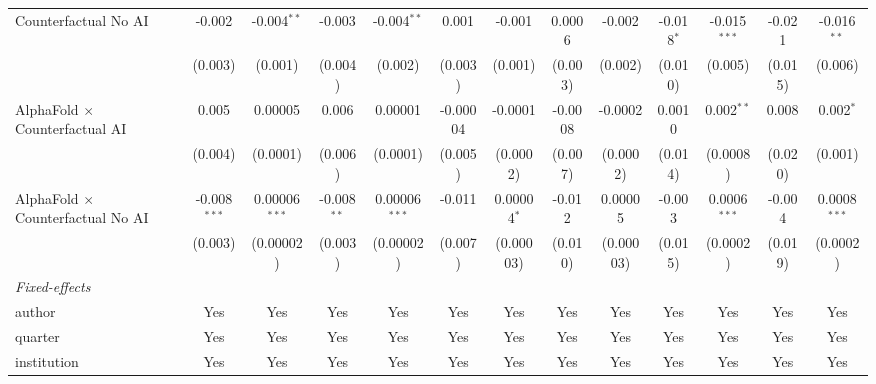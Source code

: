 \begin{tabular}{lcccccccccccc}
   Counterfactual No AI                     & -0.002         & -0.004$^{**}$   & -0.003         & -0.004$^{**}$   & 0.001         & -0.001        & 0.0006       & -0.002       & -0.018$^{*}$   & -0.015$^{***}$ & -0.021        & -0.016$^{**}$\\   
                                            & (0.003)        & (0.001)         & (0.004)        & (0.002)         & (0.003)       & (0.001)       & (0.003)      & (0.002)      & (0.010)        & (0.005)        & (0.015)       & (0.006)\\   
   AlphaFold $\times$ Counterfactual AI     & 0.005          & 0.00005         & 0.006          & 0.00001         & -0.00004      & -0.0001       & -0.0008      & -0.0002      & 0.0010         & 0.002$^{**}$   & 0.008         & 0.002$^{*}$\\   
                                            & (0.004)        & (0.0001)        & (0.006)        & (0.0001)        & (0.005)       & (0.0002)      & (0.007)      & (0.0002)     & (0.014)        & (0.0008)       & (0.020)       & (0.001)\\   
   AlphaFold $\times$ Counterfactual No AI  & -0.008$^{***}$ & 0.00006$^{***}$ & -0.008$^{**}$  & 0.00006$^{***}$ & -0.011        & 0.00004$^{*}$ & -0.012       & 0.00005      & -0.003         & 0.0006$^{***}$ & -0.004        & 0.0008$^{***}$\\   
                                            & (0.003)        & (0.00002)       & (0.003)        & (0.00002)       & (0.007)       & (0.00003)     & (0.010)      & (0.00003)    & (0.015)        & (0.0002)       & (0.019)       & (0.0002)\\   
   \midrule
   \emph{Fixed-effects}\\
   author                                   & Yes            & Yes             & Yes            & Yes             & Yes           & Yes           & Yes          & Yes          & Yes            & Yes            & Yes           & Yes\\  
   quarter                                  & Yes            & Yes             & Yes            & Yes             & Yes           & Yes           & Yes          & Yes          & Yes            & Yes            & Yes           & Yes\\  
   institution                              & Yes            & Yes             & Yes            & Yes             & Yes           & Yes           & Yes          & Yes          & Yes            & Yes            & Yes           & Yes\\  

\end{tabular}
